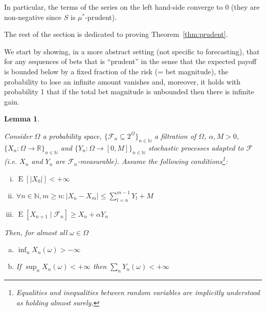 \documentclass[11pt]{article}
\theoremstyle{definition}
\theoremstyle{plain}
\newtheorem{lemma}{Lemma}%
\newcommand{\Nats}{\mathbb{N}}
\newcommand{\Reals}{\mathbb{R}}
\newcommand{\A}[1]{\lvert #1 \rvert}
\newcommand{\Sq}[2]{\{#1\}_{#2 \in \Nats}}
\newcommand{\Sqn}[1]{\Sq{#1}{n}}
\DeclareMathOperator{\E}{E}
\newcommand{\F}{\mathcal{F}}
\begin{document}
In particular, the terms of the series on the left hand-side converge to 0 (they are non-negative since $S$ is $\mu^*$-prudent).

The rest of the section is dedicated to proving Theorem~\ref{thm:prudent}.

We start by showing, in a more abstract setting (not specific to forecasting), that for any sequences of bets that is \enquote{prudent} in the sense that the expected payoff is bounded below by a fixed fraction of the risk (= bet magnitude), the probability to lose an infinite amount vanishes and, moreover, it holds with probability 1 that if the total bet magnitude is unbounded then there is infinite gain.

\begin{samepage}
\begin{lemma}
\label{lmm:prudent}

Consider $\Omega$ a probability space, $\Sqn{\F_n \subseteq 2^\Omega}$ a filtration of $\Omega$, $\alpha,M > 0$, $\Sqn{X_n: \Omega \rightarrow \Reals}$ and $\Sqn{Y_n: \Omega \rightarrow [0,M]}$ stochastic processes adapted to $\F$ (i.e. $X_n$ and $Y_n$ are $\F_n$-measurable). Assume the following conditions\footnote{Equalities and inequalities between random variables are implicitly understood as holding almost surely.}:

\begin{enumerate}[i.]

\item $\E[\A{X_0}] < +\infty$
\item $\forall n \in \Nats, m \geq n: \A{X_n - X_m} \leq \sum_{l=n}^{m-1} Y_l + M$
\item $\E[X_{n+1} \mid \F_n] \geq X_n + \alpha Y_n$

\end{enumerate}

Then, for almost all $\omega \in \Omega$

\begin{enumerate}[a.]

\item\label{itm:lmm_prudent__inf} $\inf_n X_n(\omega) > -\infty$
\item\label{itm:lmm_prudent__sup} If $\sup_n X_n(\omega) < +\infty$ then $\sum_n Y_n(\omega) < +\infty$

\end{enumerate}

\end{lemma}
\end{samepage}
\end{document}

